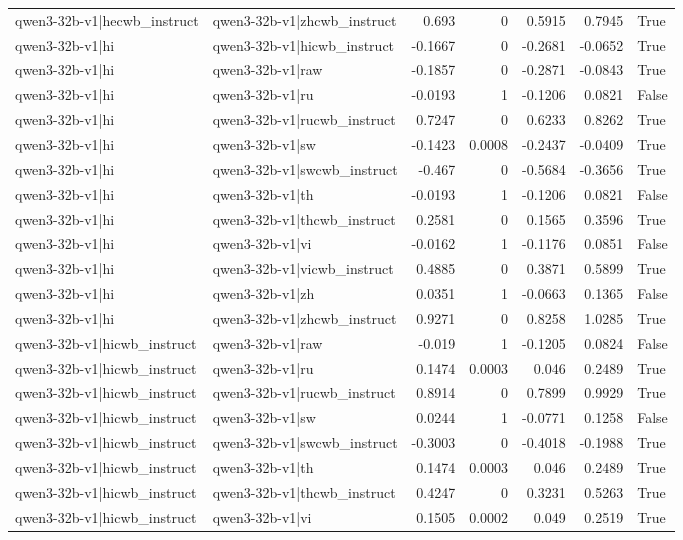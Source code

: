 \begin{table}
\begin{tabular}{l l r r r r l}
qwen3-32b-v1|hecwb_instruct & qwen3-32b-v1|zhcwb_instruct & 0.693 & 0 & 0.5915 & 0.7945 & True \\
qwen3-32b-v1|hi & qwen3-32b-v1|hicwb_instruct & -0.1667 & 0 & -0.2681 & -0.0652 & True \\
qwen3-32b-v1|hi & qwen3-32b-v1|raw & -0.1857 & 0 & -0.2871 & -0.0843 & True \\
qwen3-32b-v1|hi & qwen3-32b-v1|ru & -0.0193 & 1 & -0.1206 & 0.0821 & False \\
qwen3-32b-v1|hi & qwen3-32b-v1|rucwb_instruct & 0.7247 & 0 & 0.6233 & 0.8262 & True \\
qwen3-32b-v1|hi & qwen3-32b-v1|sw & -0.1423 & 0.0008 & -0.2437 & -0.0409 & True \\
qwen3-32b-v1|hi & qwen3-32b-v1|swcwb_instruct & -0.467 & 0 & -0.5684 & -0.3656 & True \\
qwen3-32b-v1|hi & qwen3-32b-v1|th & -0.0193 & 1 & -0.1206 & 0.0821 & False \\
qwen3-32b-v1|hi & qwen3-32b-v1|thcwb_instruct & 0.2581 & 0 & 0.1565 & 0.3596 & True \\
qwen3-32b-v1|hi & qwen3-32b-v1|vi & -0.0162 & 1 & -0.1176 & 0.0851 & False \\
qwen3-32b-v1|hi & qwen3-32b-v1|vicwb_instruct & 0.4885 & 0 & 0.3871 & 0.5899 & True \\
qwen3-32b-v1|hi & qwen3-32b-v1|zh & 0.0351 & 1 & -0.0663 & 0.1365 & False \\
qwen3-32b-v1|hi & qwen3-32b-v1|zhcwb_instruct & 0.9271 & 0 & 0.8258 & 1.0285 & True \\
qwen3-32b-v1|hicwb_instruct & qwen3-32b-v1|raw & -0.019 & 1 & -0.1205 & 0.0824 & False \\
qwen3-32b-v1|hicwb_instruct & qwen3-32b-v1|ru & 0.1474 & 0.0003 & 0.046 & 0.2489 & True \\
qwen3-32b-v1|hicwb_instruct & qwen3-32b-v1|rucwb_instruct & 0.8914 & 0 & 0.7899 & 0.9929 & True \\
qwen3-32b-v1|hicwb_instruct & qwen3-32b-v1|sw & 0.0244 & 1 & -0.0771 & 0.1258 & False \\
qwen3-32b-v1|hicwb_instruct & qwen3-32b-v1|swcwb_instruct & -0.3003 & 0 & -0.4018 & -0.1988 & True \\
qwen3-32b-v1|hicwb_instruct & qwen3-32b-v1|th & 0.1474 & 0.0003 & 0.046 & 0.2489 & True \\
qwen3-32b-v1|hicwb_instruct & qwen3-32b-v1|thcwb_instruct & 0.4247 & 0 & 0.3231 & 0.5263 & True \\
qwen3-32b-v1|hicwb_instruct & qwen3-32b-v1|vi & 0.1505 & 0.0002 & 0.049 & 0.2519 & True \\

\end{tabular}
\end{table}
